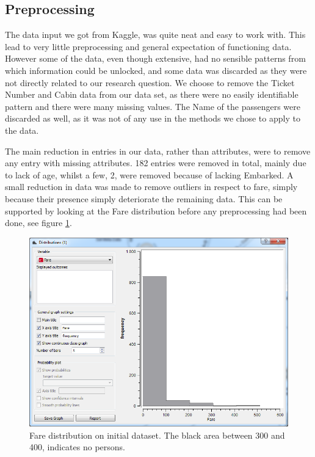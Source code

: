 \documentclass[a4paper,11pt]{article}
\begin{document}
\subsection{Preprocessing}
\label{sec:preproc}
The data input we got from Kaggle\cite{kaggleData}, was quite neat and easy to work with. This lead to very little preprocessing and general expectation of functioning data. 
However some of the data, even though extensive, had no sensible patterns from which information could be unlocked, and some data was discarded as they were not directly related to our research question.
We choose to remove the Ticket Number and Cabin data from our data set, as there were no easily identifiable pattern and there were many missing values. 
The Name of the passengers were discarded as well, as it was not of any use in the methods we chose to apply to the data. 

The main reduction in entries in our data, rather than attributes, were to remove any entry with missing attributes. 182 entries were removed in total, mainly due to lack of age, whilst a few, 2, were removed because of lacking Embarked. 
A small reduction in data was made to remove outliers in respect to fare, simply because their presence simply deteriorate the remaining data. This can be supported by looking at the Fare distribution before any preprocessing had been done, see figure \ref{farepreprocess}.

\begin{figure}[h]
\begin{center}
	\includegraphics[scale=0.6]{FarePreprocess}
\end{center}
\caption{Fare distribution on initial dataset. The black area between 300 and 400, indicates no persons.}
\label{farepreprocess}
\end{figure}
\end{document}
